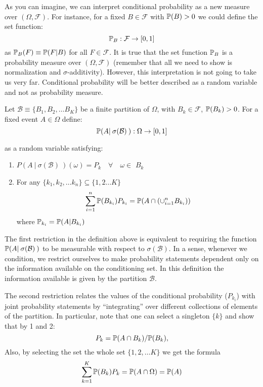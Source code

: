 \documentclass[11pt]{article} %
\begin{document}
\noindent As you can imagine, we can interpret conditional probability as a new measure over $(\Omega, \mathcal{F})$. For instance, for a fixed $B \in \mathcal{F}$ with $\mathbb{P}(B)>0$ we could define the set function:
$$\mathbb{P}_{B}: \mathcal{F} \rightarrow [0,1] $$
\noindent as $\mathbb{P}_{B}(F) \equiv \mathbb{P}(F | B)$ for all $F \in \mathcal{F}$. It is true that the set function $\mathbb{P}_{B}$ is a probability measure over $(\Omega, \mathcal{F})$ (remember that all we need to show is normalization and $\sigma$-additivity). However, this interpretation is not going to take us very far. Conditional probability will be better described as a random variable and not as probability measure.\

\begin{definition} Let $\mathcal{B} \equiv \{B_1, B_2, \ldots B_{K}\}$ be a finite partition of $\Omega$, with $B_{k} \in \mathcal{F}$, $\mathbb{P}(B_k)>0$. For a fixed event $A \in \Omega$ define:
$$\mathbb{P}(A | \: \sigma(\mathcal{B}) \: ): \Omega \rightarrow [0,1] $$ 
\end{definition}
\noindent as a random variable satisfying:
\begin{enumerate}
\item $P(A \: | \: \sigma(\mathcal{B})\: ) (\omega) = P_k \quad \forall \quad \omega \in$ $B_{k}$ 
\item For any $\{k_1, k_2, \ldots k_n\} \subseteq \{1,2 \ldots K\}$ 
$$\sum_{i=1}^{n} \mathbb{P}(B_{k_i})P_{k_i} = \mathbb{P}(A \cap (\cup_{i=1}^{n} B_{k_i}))  $$ 
where $\mathbb{P}_{k_i}=\mathbb{P}(A|B_{k_i})$
\end{enumerate}

\noindent The first restriction in the definition above is equivalent to requiring the function $\mathbb{P}(A | \: \sigma(\mathcal{B}) \: )$ to be  measurable with respect to $\sigma(\mathcal{B})$. In a sense, whenever we condition, we restrict ourselves to make probability statements dependent only on the information available on the conditioning set. In this definition the information available is given by the partition $\mathcal{B}$. 

The second restriction relates the values of the conditional probability ($P_{k_{i}}$) with joint probability statements by ``integrating'' over different collections of elements of the partition. In particular, note that one can select a singleton $\{k\}$ and show that by 1 and 2:
$$P_{k} = \mathbb{P} (A \cap B_{k}) / \mathbb{P}(B_k),$$  
\noindent Also, by selecting the set the whole set $\{1,2, \ldots K\}$ we get the formula
$$\sum_{k=1}^{K}\mathbb{P}(B_{k})P_{k} = \mathbb{P}(A \cap \Omega) = \mathbb{P}(A) $$
\end{document}
